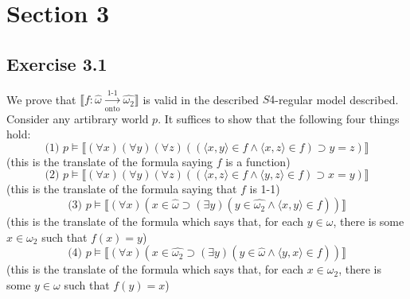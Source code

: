 \documentclass{article}
\newcommand{\lbc}{\llbracket}
\newcommand{\rbc}{\rrbracket}
\theoremstyle{definition}
\begin{document}
\section*{Section 3}

\subsection*{Exercise 3.1}
We prove that $\lbc f:\hat{\omega}\xrightarrow[\textrm{onto}]{\text{1-1}}\hat{\omega_2}\rbc$ is 
valid in the described $S4$-regular model described. Consider any artibrary world $p$. It suffices to show that 
the following four things hold:
\[\textrm{(1) }p\vDash\lbc(\forall x)(\forall y)(\forall z)((\langle x,y\rangle\in f\wedge\langle x,z\rangle\in f)\supset y=z)\rbc \]
(this is the translate of the formula saying $f$ is a function)
\[\textrm{(2) }p\vDash\lbc(\forall x)(\forall y)(\forall z)((\langle x,z\rangle\in f\wedge\langle y,z\rangle\in f)\supset x=y)\rbc \]
(this is the translate of the formula saying that $f$ is 1-1)
\[\textrm{(3) }p\vDash\lbc(\forall x)(x\in\hat{\omega}\supset(\exists y)(y\in\widehat{\omega_2}\wedge\langle x,y\rangle\in f))\rbc \]
(this is the translate of the formula which says that, for each $y\in\omega$, there is some $x\in\omega_2$ such that 
$f(x)=y$)
\[\textrm{(4) }p\vDash\lbc(\forall x)(x\in\widehat{\omega_2}\supset(\exists y)(y\in\hat{\omega}\wedge\langle y,x\rangle\in f))\rbc \]
(this is the translate of the formula which says that, for each $x\in\omega_2$, there is some $y\in\omega$ such that 
$f(y)=x$)
\end{document}
